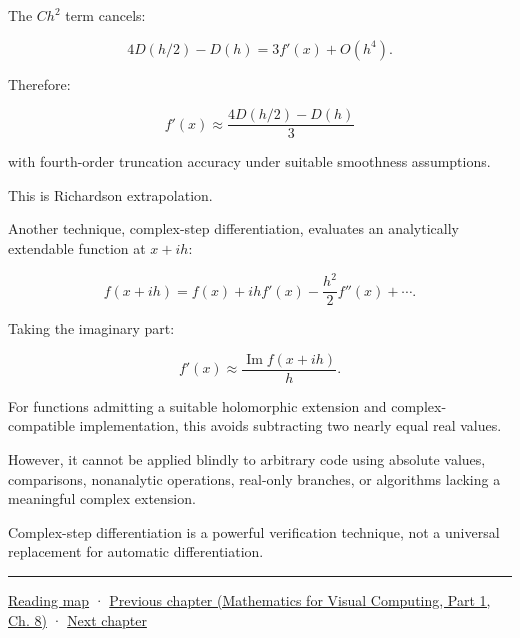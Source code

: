 The \(Ch^2\) term cancels:

\[
4D(h/2)-D(h) = 3f'(x)+O(h^4).
\]

Therefore:

\[
\boxed{ f'(x)\approx \frac{4D(h/2)-D(h)}3 }
\]

with fourth-order truncation accuracy under suitable smoothness assumptions.

This is Richardson extrapolation.

Another technique, complex-step differentiation, evaluates an analytically extendable function at \(x+ih\):

\[
f(x+ih) = f(x)+ihf'(x) -\frac{h^2}{2}f''(x)+\cdots.
\]

Taking the imaginary part:

\[
\boxed{ f'(x)\approx \frac{\operatorname{Im}f(x+ih)}h }.
\]

For functions admitting a suitable holomorphic extension and complex-compatible implementation, this avoids subtracting two nearly equal real values.

However, it cannot be applied blindly to arbitrary code using absolute values, comparisons, nonanalytic operations, real-only branches, or algorithms lacking a meaningful complex extension.

Complex-step differentiation is a powerful verification technique, not a universal replacement for automatic differentiation.

\begin{center}\rule{0.5\linewidth}{0.5pt}\end{center}

\hyperref[volume-reading-map]{Reading map} · \href{../02-Mathematics-for-Visual-Computing-P01/main.pdf\#02-foundations-ii-ch024-waiting-times-covariance-and-matrix-decomposition}{Previous chapter (Mathematics for Visual Computing, Part 1, Ch. 8)} · \hyperref[02-foundations-ii-ch026-matrix-functions-and-nonlinear-least-squares]{Next chapter}
